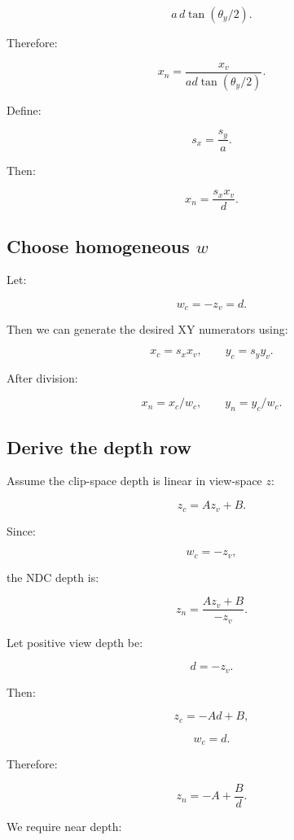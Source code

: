 \[
 a\,d\tan(\theta_y/2).
\]

Therefore:

\[
 \boxed{ x_n= \frac{x_v}{ad\tan(\theta_y/2)} }.
\]

Define:

\[
 \boxed{ s_x=\frac{s_y}{a} }.
\]

Then:

\[
 \boxed{ x_n=\frac{s_xx_v}{d} }.
\]

\subsection{\texorpdfstring{Choose homogeneous \(w\)}{Choose homogeneous w}}\label{02-foundations-ii-ch033-choose-homogeneous-w}

\hypertarget{02-foundations-ii-ch033-choose-homogeneous-w}{}

Let:

\[
 \boxed{ w_c=-z_v=d }.
\]

Then we can generate the desired XY numerators using:

\[
 x_c=s_xx_v, \qquad y_c=s_yy_v.
\]

After division:

\[
 x_n=x_c/w_c, \qquad y_n=y_c/w_c.
\]

\subsection{Derive the depth row}\label{02-foundations-ii-ch033-derive-the-depth-row}

\hypertarget{02-foundations-ii-ch033-derive-the-depth-row}{}

Assume the clip-space depth is linear in view-space \(z\):

\[
 \boxed{ z_c=Az_v+B }.
\]

Since:

\[
 w_c=-z_v,
\]

the NDC depth is:

\[
 z_n= \frac{Az_v+B}{-z_v}.
\]

Let positive view depth be:

\[
 d=-z_v.
\]

Then:

\[
 z_c=-Ad+B,
\]

\[
 w_c=d.
\]

Therefore:

\[
 \boxed{ z_n=-A+\frac Bd }.
\]

We require near depth:

